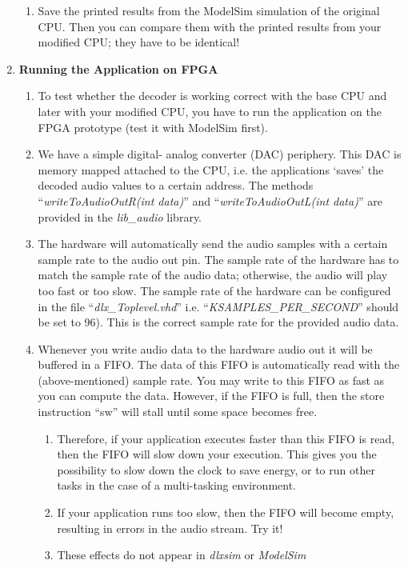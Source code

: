 \begin{enumerate}
\begin{enumerate}
		\item
		Save the printed results from the ModelSim simulation of the
		original CPU. Then you can compare them with the printed results
		from your modified CPU; they have to be identical!
	\end{enumerate}
\item \textbf{Running the Application on FPGA}
	\begin{enumerate}
		\def\labelenumii{\arabic{enumii}.}
		\item
		To test whether the decoder is working correct with the base CPU and
		later with your modified CPU, you have to run the application on the
		FPGA prototype (test it with ModelSim first).
		\item
		We have a simple digital- analog converter (DAC) periphery. This DAC
		is memory mapped attached to the CPU, i.e. the applications `saves'
		the decoded audio values to a certain address. The methods
		``\emph{writeToAudioOutR(int data)}'' and
		``\emph{writeToAudioOutL(int data)}'' are provided in the
		\emph{lib\_audio} library.
		\item
		The hardware will automatically send the audio samples with a
		certain sample rate to the audio out pin. The sample rate of the
		hardware has to match the sample rate of the audio data; otherwise,
		the audio will play too fast or too slow. The sample rate of the
		hardware can be configured in the file ``\emph{dlx\_Toplevel.vhd}''
		i.e. ``\emph{KSAMPLES\_PER\_SECOND}'' should be set to 96). This is
		the correct sample rate for the provided audio data.
		\item
		Whenever you write audio data to the hardware audio out it will be
		buffered in a FIFO. The data of this FIFO is automatically read with
		the (above-mentioned) sample rate. You may write to this FIFO as
		fast as you can compute the data. However, if the FIFO is full, then
		the store instruction ``sw'' will stall until some space becomes
		free.
		\begin{enumerate}
			\item
			Therefore, if your application executes faster than this FIFO is
			read, then the FIFO will slow down your execution. This gives you
			the possibility to slow down the clock to save energy, or to run
			other tasks in the case of a multi-tasking environment.
			\item
			If your application runs too slow, then the FIFO will become
			empty, resulting in errors in the audio stream. Try it!
			\item
			These effects do not appear in \emph{dlxsim} or \emph{ModelSim}

\end{enumerate}
\end{enumerate}
\end{enumerate}
